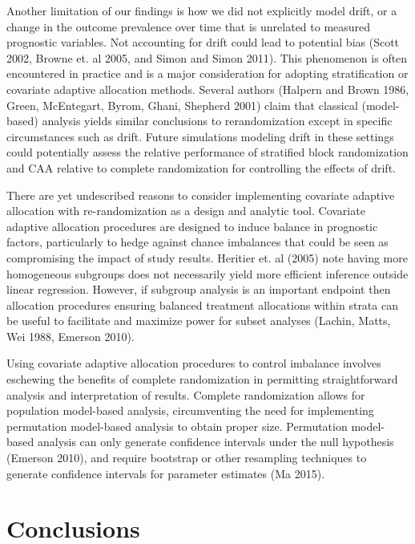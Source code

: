 Another limitation of our findings is how we did not explicitly model drift, or a change in the outcome prevalence over time that is unrelated to measured prognostic variables.
Not accounting for drift could lead to potential bias (Scott 2002, Browne et. al 2005, and Simon and Simon 2011).
This phenomenon is often encountered in practice and is a major consideration for adopting stratification or covariate adaptive allocation methods.
Several authors (Halpern and Brown 1986, Green, McEntegart, Byrom, Ghani, Shepherd 2001) claim that classical (model-based) analysis yields similar conclusions to rerandomization except in specific circumstances such as drift.
Future simulations modeling drift in these settings could potentially assess the relative performance of stratified block randomization and CAA relative to complete randomization for controlling the effects of drift.

There are yet undescribed reasons to consider implementing covariate adaptive allocation with re-randomization as a design and analytic tool.
Covariate adaptive allocation procedures are designed to induce balance in prognostic factors, particularly to hedge against chance imbalances that could be seen as compromising the impact of study results. 
Heritier et. al (2005) note having more homogeneous subgroups does not necessarily yield more efficient inference outside linear regression.
However, if subgroup analysis is an important endpoint then allocation procedures ensuring balanced treatment allocations within strata can be useful to facilitate and maximize power for subset analyses (Lachin, Matts, Wei 1988, Emerson 2010).

Using covariate adaptive allocation procedures to control imbalance involves eschewing the benefits of complete randomization in permitting straightforward analysis and interpretation of results.
Complete randomization allows for population model-based analysis, circumventing the need for implementing permutation model-based analysis to obtain proper size.
Permutation model-based analysis can only generate confidence intervals under the null hypothesis (Emerson 2010), and require bootstrap or other resampling techniques to generate confidence intervals for parameter estimates (Ma 2015).

\section{Conclusions}

